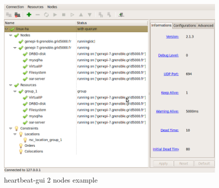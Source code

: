 \documentclass[a4paper,10pt]{report}
\begin{document}
\begin{figure}[H]
\centering
\includegraphics[scale=0.4]{schema/hb_gui-2nodes.png}
\caption{heartbeat-gui 2 nodes example} 
\label{hb-gui-2nodes} 
\end{figure}
\end{document}
